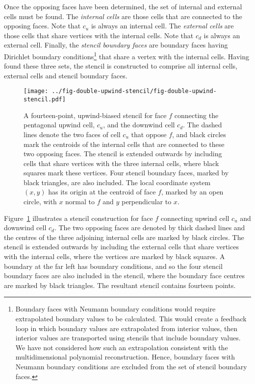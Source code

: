 Once the opposing faces have been determined, the set of internal and external cells must be found.  The \textit{internal cells} are those cells that are connected to the opposing faces.  Note that $c_u$ is always an internal cell.  The \textit{external cells} are those cells that share vertices with the internal cells.  Note that $c_d$ is always an external cell.  Finally, the \textit{stencil boundary faces} are boundary faces having Dirichlet boundary conditions\footnote{Boundary faces with Neumann boundary conditions would require extrapolated boundary values to be calculated.
This would create a feedback loop in which boundary values are extrapolated from interior values, then interior values are transported using stencils that include boundary values.  
We have not considered how such an extrapolation  consistent with the multidimensional polynomial reconstruction.
Hence, boundary faces with Neumann boundary conditions are excluded from the set of stencil boundary faces.} that share a vertex with the internal cells.
Having found these three sets, the stencil is constructed to comprise all internal cells, external cells and stencil boundary faces.


\begin{figure}
	\centering
	\texttt{[image: ../fig-double-upwind-stencil/fig-double-upwind-stencil.pdf]}
	\caption{A fourteen-point, upwind-biased stencil for face $f$ connecting the pentagonal upwind cell, $c_u$, and the downwind cell $c_d$.  The dashed lines denote the two faces of cell $c_u$ that oppose $f$, and black circles mark the centroids of the internal cells that are connected to these two opposing faces.  The stencil is extended outwards by including cells that share vertices with the three internal cells, where black squares mark these vertices.  Four stencil boundary faces, marked by black triangles, are also included.
The local coordinate system $(x, y)$ has its origin at the centroid of face $f$, marked by an open circle, with $x$ normal to $f$ and $y$ perpendicular to $x$.}
	\label{fig:double-upwind-stencil}
\end{figure}

Figure~\ref{fig:double-upwind-stencil} illustrates a stencil construction for face $f$ connecting upwind cell $c_u$ and downwind cell $c_d$.  The two opposing faces are denoted by thick dashed lines and the centres of the three adjoining internal cells are marked by black circles.  The stencil is extended outwards by including the external cells that share vertices with the internal cells, where the vertices are marked by black squares.  A boundary at the far left has  boundary conditions, and so the four stencil boundary faces are also included in the stencil, where the boundary face centres are marked by black triangles.  The resultant stencil contains fourteen points.


